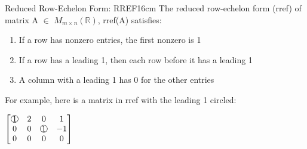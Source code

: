     \begin{definition}{Reduced Row-Echelon Form: RREF}{16cm}
        The {\color{lblue} reduced row-echelon form (rref)} of
        matrix A $\in$ $M_{m \times n}(\mathbb{R})$, rref(A) satisfies:

        \begin{enumerate}[label=(\alph*), leftmargin=1cm, itemsep=0.1cm]
            \item If a row has nonzero entries, the first nonzero is 1
    
            \item If a row has a leading 1, then each row before it has a leading 1
    
            \item A column with a leading 1 has 0 for the other entries
        \end{enumerate}

        For example, here is a matrix in rref with the leading 1 circled:

        \hspace{0.5cm}
        $\begin{bmatrix}
            \circnum{1} & 2 & 0 & 1 \\
            0 & 0 & \circnum{1} & -1 \\
            0 & 0 & 0 & 0
        \end{bmatrix}$
    \end{definition}

    \vspace{0.5cm}



